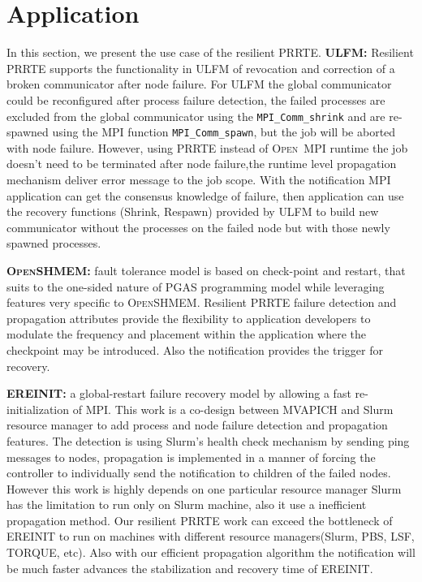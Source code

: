 \documentclass[sigconf]{acmart}
\newcommand{\mpifunc}[1]{\lstinline"MPI_#1"\xspace}
\newcommand{\prrte}[0]{\textsc{PRRTE}\xspace}
\newcommand{\ompi}[0]{\textsc{Open~MPI}\xspace}
\newcommand{\ulfm}[0]{\textsc{ULFM}\xspace}
\newcommand{\mpi}[0]{\textsc{MPI}\xspace}
\newcommand{\oshmem}[0]{\textsc{OpenSHMEM}\xspace}
\begin{document}
\section{Application}\label{sec:motivation}
In this section, we present the use case of the resilient \prrte.
\textbf{\ulfm:} Resilient \prrte supports the functionality in \ulfm of revocation and correction of a broken communicator after node failure. For \ulfm the global communicator could be reconfigured after process failure detection, the failed processes are excluded from the global communicator using the \mpifunc{Comm_shrink} and are re-spawned using the \mpi function \mpifunc{Comm_spawn}, but the job will be aborted with node failure. However, using \prrte instead of \ompi runtime the job doesn't need to be terminated after node failure,the runtime level propagation mechanism deliver error message to the job scope. With the notification \mpi application can get the consensus knowledge of failure, then application can use the recovery functions (Shrink, Respawn) provided by \ulfm to build new communicator without the processes on the failed node but with those newly spawned processes. 

\textbf{\oshmem:} fault tolerance model is based on check-point and restart, that suits to the one-sided nature of PGAS programming model while leveraging features very specific to \oshmem. Resilient \prrte failure detection and propagation attributes provide the flexibility to application developers to modulate the frequency and placement within the application where the checkpoint may be introduced. Also the notification provides the trigger for recovery. 

\textbf{EREINIT:} a global-restart failure recovery model by allowing a fast re-initialization of \mpi. This work is a co-design between MVAPICH and Slurm resource manager to add process and node failure detection and propagation features. The detection is using Slurm's health check mechanism by sending ping messages to nodes, propagation is implemented in a manner of forcing the controller to individually send the notification to children of the failed nodes. However this work is highly depends on one particular resource manager Slurm has the limitation to run only on Slurm machine, also it use a inefficient propagation method. Our resilient \prrte work can exceed the bottleneck of EREINIT to run on machines with different resource managers(Slurm, PBS, LSF, TORQUE, etc). Also with our efficient propagation algorithm the notification will be much faster advances the stabilization and recovery time of EREINIT.
\end{document}

